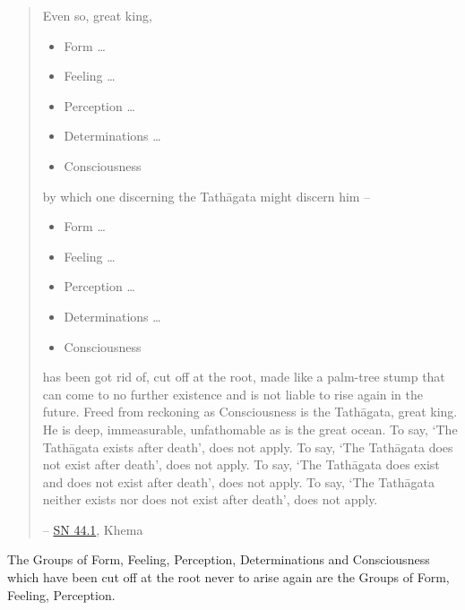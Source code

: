 \begin{quote}
Even so, great king,

\begin{itemize}
\item
   Form \ldots\hspace{0pt}
\item
   Feeling \ldots\hspace{0pt}
\item
   Perception \ldots\hspace{0pt}
\item
   Determinations \ldots\hspace{0pt}
\item
   Consciousness
\end{itemize}

by which one discerning the Tathāgata might discern him -- 

\begin{itemize}
\item
   Form \ldots\hspace{0pt}
\item
   Feeling \ldots\hspace{0pt}
\item
   Perception \ldots\hspace{0pt}
\item
   Determinations \ldots\hspace{0pt}
\item
   Consciousness
\end{itemize}

has been got rid of, cut off at the root, made like a palm-tree stump that can come to no further existence and is not liable to rise again in the future. Freed from reckoning as Consciousness is the Tathāgata, great king. He is deep, immeasurable, unfathomable as is the great ocean. To say, `The Tathāgata exists after death', does not apply. To say, `The Tathāgata does not exist after death', does not apply. To say, `The Tathāgata does exist and does not exist after death', does not apply. To say, `The Tathāgata neither exists nor does not exist after death', does not apply.

 -- \href{https://suttacentral.net/sn44.1/en/bodhi}{SN 44.1}, Khema
\end{quote}

The Groups of Form, Feeling, Perception, Determinations and Consciousness which have been cut off at the root never to arise again are the  Groups of Form, Feeling, Perception.

